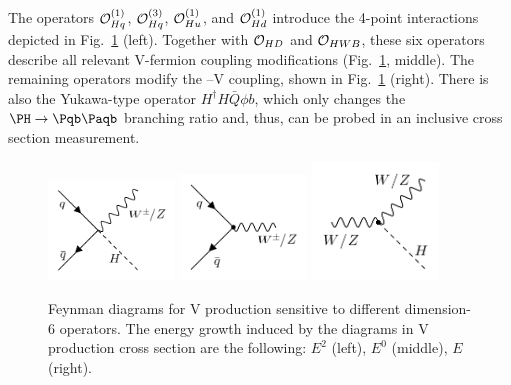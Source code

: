 \documentclass[a4paper,11pt]{article}
\newcommand{\Pb}{{{\Pqb}}\xspace}
\newcommand{\PAb}{{{{\Paqb}}}\xspace}
\renewcommand{\PV}{{{{V}}}\xspace}
\newcommand{\VH}{{{\PV}{\PH}}\xspace}
\begin{document}
The operators ${\cal O}^{(1)}_{Hq}$, ${\cal O}^{(3)}_{Hq}$, ${\cal O}^{(1)}_{Hu}$, and ${\cal O}^{(1)}_{Hd}$ introduce the 4-point interactions depicted in Fig.~\ref{fig:Feynman_digarams} (left). 
Together with ${\cal O}_{HD}$ and ${\cal O}_{HWB}$, these six operators describe all relevant \PV-fermion coupling modifications (Fig.~\ref{fig:Feynman_digarams}, middle). 
The remaining operators modify the \PH--\PV coupling, shown in Fig.~\ref{fig:Feynman_digarams} (right). 
There is also the Yukawa-type operator $H^\dagger H \bar{Q}\phi b$, which only changes the $\PH \to \Pb \PAb$ branching ratio and, thus, can be probed in an inclusive cross section measurement. 
\begin{figure}[hbtp]
\begin{center}
\includegraphics[width=0.3\textwidth]{Figures/Feynman_diagrams/ffVh.png}
\includegraphics[width=0.3\textwidth]{Figures/Feynman_diagrams/Vff.png}
\includegraphics[width=0.3\textwidth]{Figures/Feynman_diagrams/hVV.png}
\end{center}
\caption{
Feynman diagrams for \VH production sensitive to different dimension-6 operators.
The energy growth induced by the diagrams in \VH production cross section are the following: $E^2$ (left), $E^0$ (middle), $E$ (right). 
}
\label{fig:Feynman_digarams}
\end{figure}

\end{document}
